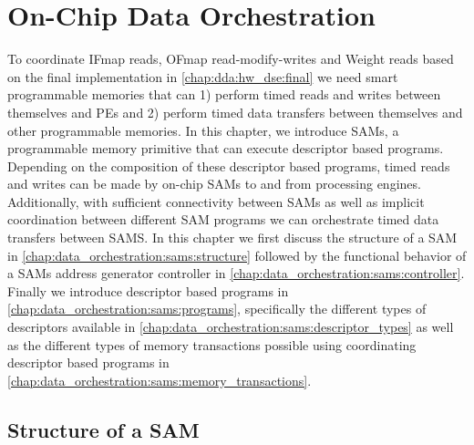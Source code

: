 \chapter{On-Chip Data Orchestration}
\label{chap:data_orchestration}

To coordinate IFmap reads, OFmap read-modify-writes and Weight reads based on
the final implementation in \autoref{chap:dda:hw_dse:final} we need smart
programmable memories that can 1) perform timed reads and writes between
themselves and PEs and 2) perform timed data transfers between
themselves and other programmable memories. In this chapter, we introduce \ac{SAM}s, a programmable memory
primitive that can execute descriptor based programs. Depending on the
composition of these descriptor based programs, timed reads and writes can be
made by on-chip SAMs to and from processing engines. Additionally, with sufficient
connectivity between SAMs as well as implicit coordination between different SAM
programs we can orchestrate timed data transfers between SAMS. In this chapter
we first discuss the structure of a SAM in \autoref{chap:data_orchestration:sams:structure}
followed by the functional behavior of a SAMs address generator controller in
\autoref{chap:data_orchestration:sams:controller}. Finally we introduce descriptor based programs in
\autoref{chap:data_orchestration:sams:programs}, specifically the different types of descriptors
available in \autoref{chap:data_orchestration:sams:descriptor_types} as well as the different types
of memory transactions possible using coordinating descriptor based programs in
\autoref{chap:data_orchestration:sams:memory_transactions}.

\clearpage
\section{Structure of a SAM}
\label{chap:data_orchestration:sams:structure}

